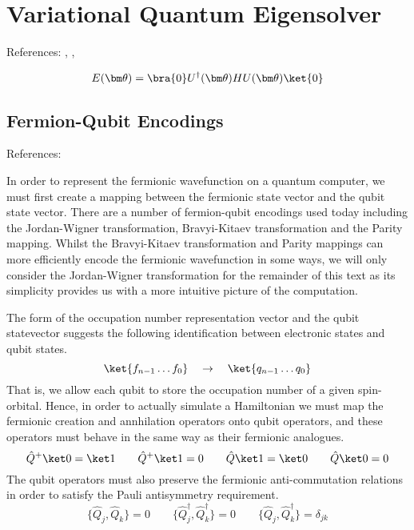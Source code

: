 \section{\label{vqe}Variational Quantum Eigensolver}
References: \cite{Anand2021}, \cite{McClean2016}, \cite{Chan2021}

\begin{equation*}
    E(\bm\theta) = \bra{0} U^\dagger(\bm\theta) H U(\bm\theta) \ket{0} 
\end{equation*}

\subsection{\label{fermion-qubit-encodings}Fermion-Qubit Encodings}
References: \cite{Seeley2020}

In order to represent the fermionic wavefunction on a quantum computer, we must first create a mapping between the fermionic state vector and the qubit state vector. There are a number of fermion-qubit encodings used today including the Jordan-Wigner transformation, Bravyi-Kitaev transformation and the Parity mapping. Whilst the Bravyi-Kitaev transformation and Parity mappings can more efficiently encode the fermionic wavefunction in some ways, we will only consider the Jordan-Wigner transformation for the remainder of this text as its simplicity provides us with a more intuitive picture of the computation.

The form of the occupation number representation vector and the qubit statevector suggests the following identification between electronic states and qubit states.
\begin{equation*}
    \ket{f_{n-1} \dots f_{0}} \quad\rightarrow\quad \ket{q_{n-1} \dots q_{0}}
\end{equation*}
That is, we allow each qubit to store the occupation number of a given spin-orbital. Hence, in order to actually simulate a Hamiltonian we must map the fermionic creation and annhilation operators onto qubit operators, and these operators must behave in the same way as their fermionic analogues.
\begin{equation*}
    \hat Q^+ \ket 0 = \ket 1 \qquad
    \hat Q^+ \ket 1 = 0 \qquad
    \hat Q \ket 1 = \ket 0 \qquad
    \hat Q \ket 0 = 0
\end{equation*}
The qubit operators must also preserve the fermionic anti-commutation relations in order to satisfy the Pauli antisymmetry requirement.
\begin{equation*}
    \{ \hat Q_{j}, \hat Q_{k} \} = 0 \qquad
    \{ \hat Q_{j}^{\dagger}, \hat Q_{k}^{\dagger} \} = 0 \qquad
    \{ \hat Q_{j}, \hat Q_{k}^{\dagger} \} = \delta_{jk}
\end{equation*}

